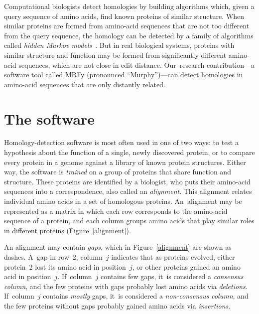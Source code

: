 \documentclass[nonatbib]{sigplanconf}
\newcommand\figref[1]{Figure~\ref{#1}}
\newcommand\secref[1]{Section~\ref{sec:#1}}
\let\cite\citep
\begin{document}
Computational biologists detect homologies by building 
algorithms which, given a {query sequence} of amino acids,
find known proteins of similar structure.
When similar proteins are formed from amino-acid sequences that
are not too different from the query sequence, the homology can be
detected by
a family of algorithms called 
\textit{hidden Markov models}~\cite{Eddy:1998ut}.
But in real biological systems,
proteins with similar structure and function may be formed from significantly 
different amino-acid sequences, which are not close in edit distance.
Our~research contribution---a software tool called MRFy (pronounced
``Murphy'')---can detect homologies 
in amino-acid sequences that are only distantly related.
%
%

%
%
%


\section{The software}



Homology-detection software is most often used in one of two ways:
to test a hypothesis about 
the function of a single, newly discovered protein, or 
to compare every protein in a genome against a library of known protein 
structures.
Either way, 
the software is \emph{trained}
on a group of proteins that share function and structure.
These proteins are identified by a biologist, who puts
their amino-acid sequences into a correspondence, also called an
\emph{alignment}. 
This alignment relates individual amino acids in a set of homologous proteins.
An~alignment may be represented as a matrix
in which each row corresponds to the amino-acid sequence of a protein,
and each column groups amino acids that play similar roles in
different proteins (Figure~\ref{alignment}).


An alignment may contain \emph{gaps}, which in 
\figref{alignment} are shown as dashes.
A~gap in row~2, column~$j$ indicates that as proteins evolved, either 
protein~2 lost its amino acid in position~$j$, or 
other proteins gained an amino acid in position~$j$.
If~column~$j$ contains few gaps, 
it~is considered a \emph{consensus column},
and the few proteins with gaps probably lost amino acids via
\emph{deletions}.
If~column~$j$ contains \emph{mostly} gaps, 
it~is considered a \emph{non-consensus column},
and the few proteins without gaps probably gained amino acids via
\emph{insertions}. 
\end{document}
